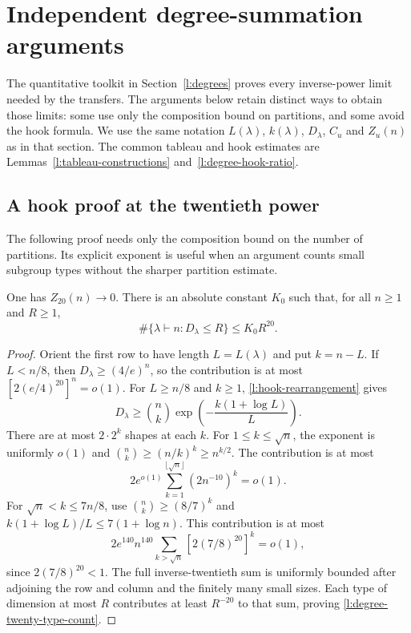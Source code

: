 \section{Independent degree-summation arguments}
\label{l:degree-supplement}

The quantitative toolkit in Section~\ref{l:degrees} proves every
inverse-power limit needed by the transfers. The arguments below retain
distinct ways to obtain those limits: some use only the composition
bound on partitions, and some avoid the hook formula. We use the same
notation $L(\lambda)$, $k(\lambda)$, $D_\lambda$, $C_u$ and $Z_u(n)$
as in that section. The common tableau and hook estimates are
Lemmas~\ref{l:tableau-constructions} and~\ref{l:degree-hook-ratio}.

\subsection{A hook proof at the twentieth power}

The following proof needs only the composition bound on the number of
partitions.  Its explicit exponent is useful when an argument counts
small subgroup types without the sharper partition estimate.

\begin{lemma}
\label{l:degree-reciprocal-twenty}
One has $Z_{20}(n)\to0$.  There is an absolute constant $K_0$ such
that, for all $n\ge1$ and $R\ge1$,
\begin{equation}\label{l:degree-twenty-type-count}
 \#\{\lambda\vdash n:D_\lambda\le R\}\le K_0R^{20}.
\end{equation}
\end{lemma}
\begin{proof}
Orient the first row to have length $L=L(\lambda)$ and put $k=n-L$.
If $L<n/8$, then $D_\lambda\ge(4/e)^n$, so the contribution is at
most $[2(e/4)^{20}]^n=o(1)$.
For $L\ge n/8$ and $k\ge1$, \eqref{l:hook-rearrangement} gives
\[
 D_\lambda\ge\binom nk
                  \exp\left(-\frac{k(1+\log L)}L\right).
\]
There are at most $2\cdot2^k$ shapes at each $k$.
For $1\le k\le\sqrt n$, the exponent is uniformly $o(1)$ and
$\binom nk\ge(n/k)^k\ge n^{k/2}$.  The contribution is at most
\[
 2e^{o(1)}\sum_{k=1}^{\lfloor\sqrt n\rfloor}(2n^{-10})^k=o(1).
\]
For $\sqrt n<k\le7n/8$, use
$\binom nk\ge(8/7)^k$ and
$k(1+\log L)/L\le7(1+\log n)$.  This contribution is at most
\[
 2e^{140}n^{140}
       \sum_{k>\sqrt n}[2(7/8)^{20}]^k=o(1),
\]
since $2(7/8)^{20}<1$.  The full inverse-twentieth sum is uniformly
bounded after adjoining the row and column and the finitely many small
sizes.  Each type of dimension at most $R$ contributes at least
$R^{-20}$ to that sum, proving \eqref{l:degree-twenty-type-count}.
\end{proof}

